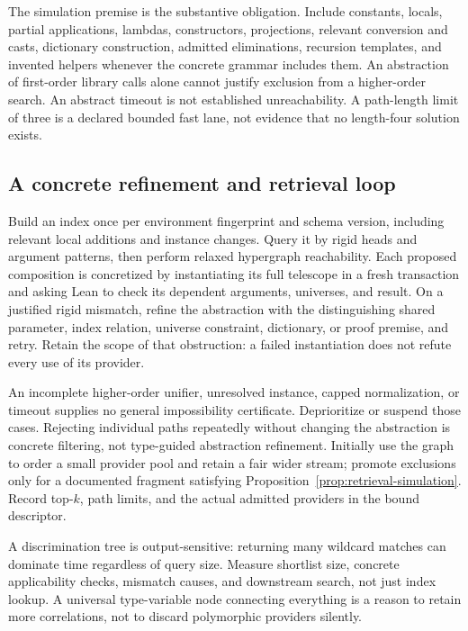 The simulation premise is the substantive obligation. Include constants, locals, partial applications, lambdas, constructors, projections, relevant conversion and casts, dictionary construction, admitted eliminations, recursion templates, and invented helpers whenever the concrete grammar includes them. An abstraction of first-order library calls alone cannot justify exclusion from a higher-order search. An abstract timeout is not established unreachability. A path-length limit of three is a declared bounded fast lane, not evidence that no length-four solution exists.

\subsection{A concrete refinement and retrieval loop}\label{sec:retrieval-loop}

Build an index once per environment fingerprint and schema version, including relevant local additions and instance changes. Query it by rigid heads and argument patterns, then perform relaxed hypergraph reachability. Each proposed composition is concretized by instantiating its full telescope in a fresh transaction and asking Lean to check its dependent arguments, universes, and result. On a justified rigid mismatch, refine the abstraction with the distinguishing shared parameter, index relation, universe constraint, dictionary, or proof premise, and retry. Retain the scope of that obstruction: a failed instantiation does not refute every use of its provider.

An incomplete higher-order unifier, unresolved instance, capped normalization, or timeout supplies no general impossibility certificate. Deprioritize or suspend those cases. Rejecting individual paths repeatedly without changing the abstraction is concrete filtering, not type-guided abstraction refinement. Initially use the graph to order a small provider pool and retain a fair wider stream; promote exclusions only for a documented fragment satisfying Proposition~\ref{prop:retrieval-simulation}. Record top-$k$, path limits, and the actual admitted providers in the bound descriptor.

A discrimination tree is output-sensitive: returning many wildcard matches can dominate time regardless of query size. Measure shortlist size, concrete applicability checks, mismatch causes, and downstream search, not just index lookup. A universal type-variable node connecting everything is a reason to retain more correlations, not to discard polymorphic providers silently.

